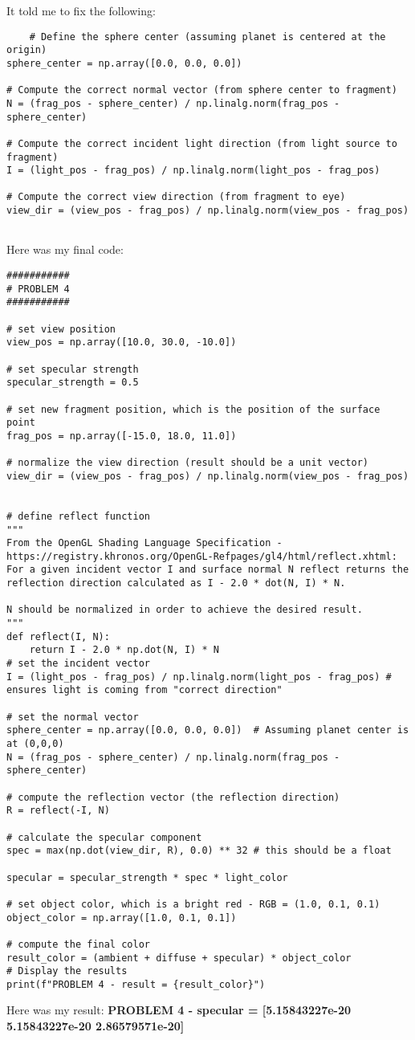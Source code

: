 \documentclass{article}
\begin{document}
It told me to fix the following: 
\begin{verbatim}
    # Define the sphere center (assuming planet is centered at the origin)
sphere_center = np.array([0.0, 0.0, 0.0])

# Compute the correct normal vector (from sphere center to fragment)
N = (frag_pos - sphere_center) / np.linalg.norm(frag_pos - sphere_center)

# Compute the correct incident light direction (from light source to fragment)
I = (light_pos - frag_pos) / np.linalg.norm(light_pos - frag_pos)

# Compute the correct view direction (from fragment to eye)
view_dir = (view_pos - frag_pos) / np.linalg.norm(view_pos - frag_pos)


\end{verbatim}
Here was my final code: 
\begin{verbatim}
###########
# PROBLEM 4
###########

# set view position
view_pos = np.array([10.0, 30.0, -10.0])

# set specular strength
specular_strength = 0.5

# set new fragment position, which is the position of the surface point
frag_pos = np.array([-15.0, 18.0, 11.0])

# normalize the view direction (result should be a unit vector)
view_dir = (view_pos - frag_pos) / np.linalg.norm(view_pos - frag_pos)


# define reflect function 
"""
From the OpenGL Shading Language Specification - https://registry.khronos.org/OpenGL-Refpages/gl4/html/reflect.xhtml:
For a given incident vector I and surface normal N reflect returns the reflection direction calculated as I - 2.0 * dot(N, I) * N.

N should be normalized in order to achieve the desired result.
"""
def reflect(I, N):
    return I - 2.0 * np.dot(N, I) * N
# set the incident vector
I = (light_pos - frag_pos) / np.linalg.norm(light_pos - frag_pos) # ensures light is coming from "correct direction"

# set the normal vector
sphere_center = np.array([0.0, 0.0, 0.0])  # Assuming planet center is at (0,0,0)
N = (frag_pos - sphere_center) / np.linalg.norm(frag_pos - sphere_center)

# compute the reflection vector (the reflection direction)
R = reflect(-I, N)

# calculate the specular component
spec = max(np.dot(view_dir, R), 0.0) ** 32 # this should be a float

specular = specular_strength * spec * light_color

# set object color, which is a bright red - RGB = (1.0, 0.1, 0.1)
object_color = np.array([1.0, 0.1, 0.1])

# compute the final color
result_color = (ambient + diffuse + specular) * object_color
# Display the results
print(f"PROBLEM 4 - result = {result_color}")
\end{verbatim}
Here was my result: \textbf{PROBLEM 4 - specular = [5.15843227e-20 5.15843227e-20 2.86579571e-20]}
\end{document}
